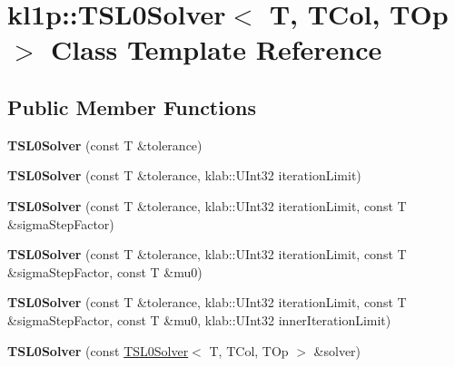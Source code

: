 \hypertarget{classkl1p_1_1TSL0Solver}{}\section{kl1p\+:\+:T\+S\+L0\+Solver$<$ T, T\+Col, T\+Op $>$ Class Template Reference}
\label{classkl1p_1_1TSL0Solver}
\subsection*{Public Member Functions}
\begin{DoxyCompactItemize}
\item 
{\bfseries T\+S\+L0\+Solver} (const T \&tolerance)\hypertarget{classkl1p_1_1TSL0Solver_a0455854a68a9c7af3c94ba0dbf8afcee}{}\label{classkl1p_1_1TSL0Solver_a0455854a68a9c7af3c94ba0dbf8afcee}

\item 
{\bfseries T\+S\+L0\+Solver} (const T \&tolerance, klab\+::\+U\+Int32 iteration\+Limit)\hypertarget{classkl1p_1_1TSL0Solver_aab828e6d0edfb0fb884ff6d63f7243ea}{}\label{classkl1p_1_1TSL0Solver_aab828e6d0edfb0fb884ff6d63f7243ea}

\item 
{\bfseries T\+S\+L0\+Solver} (const T \&tolerance, klab\+::\+U\+Int32 iteration\+Limit, const T \&sigma\+Step\+Factor)\hypertarget{classkl1p_1_1TSL0Solver_a3b2040e0d51e9bf50c0c147529513744}{}\label{classkl1p_1_1TSL0Solver_a3b2040e0d51e9bf50c0c147529513744}

\item 
{\bfseries T\+S\+L0\+Solver} (const T \&tolerance, klab\+::\+U\+Int32 iteration\+Limit, const T \&sigma\+Step\+Factor, const T \&mu0)\hypertarget{classkl1p_1_1TSL0Solver_a11ea44f30c0e3403ea8b7f6480860893}{}\label{classkl1p_1_1TSL0Solver_a11ea44f30c0e3403ea8b7f6480860893}

\item 
{\bfseries T\+S\+L0\+Solver} (const T \&tolerance, klab\+::\+U\+Int32 iteration\+Limit, const T \&sigma\+Step\+Factor, const T \&mu0, klab\+::\+U\+Int32 inner\+Iteration\+Limit)\hypertarget{classkl1p_1_1TSL0Solver_a4b156e414fdee791146fd500393a807a}{}\label{classkl1p_1_1TSL0Solver_a4b156e414fdee791146fd500393a807a}

\item 
{\bfseries T\+S\+L0\+Solver} (const \hyperlink{classkl1p_1_1TSL0Solver}{T\+S\+L0\+Solver}$<$ T, T\+Col, T\+Op $>$ \&solver)\hypertarget{classkl1p_1_1TSL0Solver_af5ef036daa1bbd0a25642499e0b24f65}{}\label{classkl1p_1_1TSL0Solver_af5ef036daa1bbd0a25642499e0b24f65}


\end{DoxyCompactItemize}
